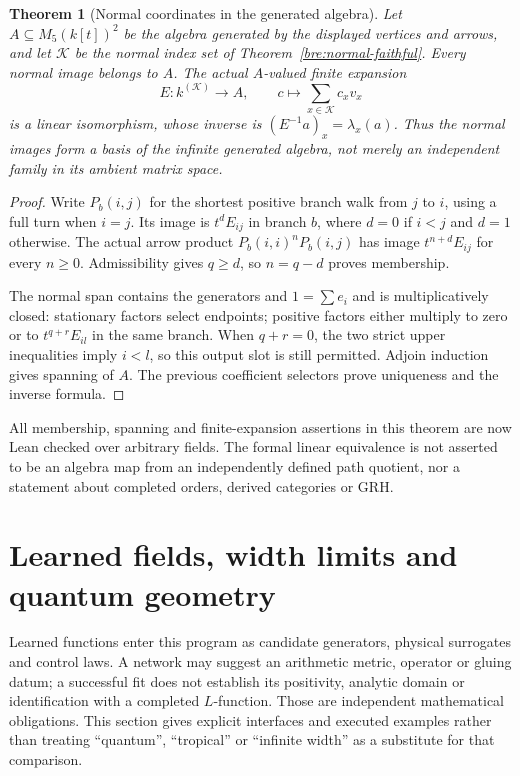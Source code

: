\documentclass[11pt]{article}
\newtheorem{theorem}{Theorem}[section]
\theoremstyle{definition}\newtheorem{definition}[theorem]{Definition}
\theoremstyle{remark}\newtheorem{remark}[theorem]{Remark}
\begin{document}
\begin{theorem}[Normal coordinates in the generated algebra]\label{bre:normal-generated}
Let $A\subseteq M_5(k[t])^2$ be the algebra generated by the displayed
vertices and arrows, and let $\mathcal K$ be the normal index set of
Theorem~\ref{bre:normal-faithful}. Every normal image belongs to $A$.
The actual $A$-valued finite expansion
\[
 E:k^{(\mathcal K)}\longrightarrow A,\qquad
 c\longmapsto\sum_{x\in\mathcal K}c_xv_x
\]
is a linear isomorphism, whose inverse is $(E^{-1}a)_x=\lambda_x(a)$.
Thus the normal images form a basis of the infinite generated algebra,
not merely an independent family in its ambient matrix space.
\end{theorem}
\begin{proof}
Write $P_b(i,j)$ for the shortest positive branch walk from $j$ to $i$,
using a full turn when $i=j$. Its image is $t^dE_{ij}$ in branch $b$,
where $d=0$ if $i<j$ and $d=1$ otherwise. The actual arrow product
$P_b(i,i)^nP_b(i,j)$ has image $t^{n+d}E_{ij}$ for every $n\geq0$.
Admissibility gives $q\geq d$, so $n=q-d$ proves membership.

The normal span contains the generators and $1=\sum e_i$ and is
multiplicatively closed: stationary factors select endpoints; positive
factors either multiply to zero or to $t^{q+r}E_{il}$ in the same branch.
When $q+r=0$, the two strict upper inequalities imply $i<l$, so this
output slot is still permitted. Adjoin induction gives spanning of $A$.
The previous coefficient selectors prove uniqueness and the inverse formula.
\end{proof}
All membership, spanning and finite-expansion assertions in this theorem
are now Lean checked over arbitrary fields. The formal linear equivalence
is not asserted to be an algebra map from an independently defined path
quotient, nor a statement about completed orders, derived categories or GRH.

\section{Learned fields, width limits and quantum geometry}\label{lf:core}
Learned functions enter this program as candidate generators, physical
surrogates and control laws. A network may suggest an arithmetic metric,
operator or gluing datum; a successful fit does not establish its positivity,
analytic domain or identification with a completed $L$-function. Those are
independent mathematical obligations. This section gives explicit interfaces
and executed examples rather than treating ``quantum'', ``tropical'' or
``infinite width'' as a substitute for that comparison.
\end{document}
